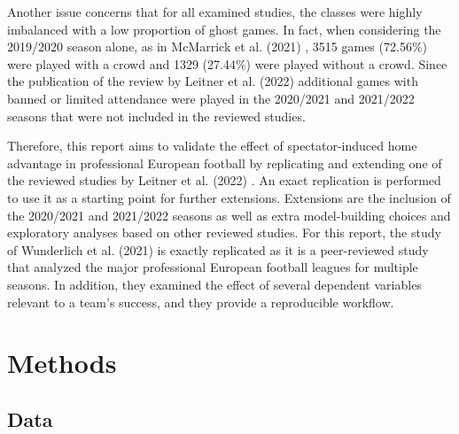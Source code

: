 Another issue concerns that for all examined studies, the classes were highly imbalanced with a low proportion of ghost games. In fact, when considering the 2019/2020 season alone, as in McMarrick et al. (2021) \cite{mccarrick2021home}, 3515 games (72.56\%) were played with a crowd and 1329 (27.44\%) were played without a crowd. Since the publication of the review by Leitner et al. (2022) \cite{leitner2022cauldron} additional games with banned or limited attendance were played in the 2020/2021 and 2021/2022 seasons that were not included in the reviewed studies. 

Therefore, this report aims to validate the effect of spectator-induced home advantage in professional European football by replicating and extending one of the reviewed studies by Leitner et al. (2022) \cite{leitner2022cauldron}. An exact replication is performed to use it as a starting point for further extensions. Extensions are the inclusion of the 2020/2021 and 2021/2022 seasons as well as extra model-building choices \cite{hox2017multilevel} and exploratory analyses based on other reviewed studies. For this report, the study of Wunderlich et al. (2021) \cite{wunderlich2021does} is exactly replicated as it is a peer-reviewed study that analyzed the major professional European football leagues for multiple seasons. In addition, they examined the effect of several dependent variables relevant to a team's success, and they provide a reproducible workflow.

\section{Methods}
\subsection{Data}

